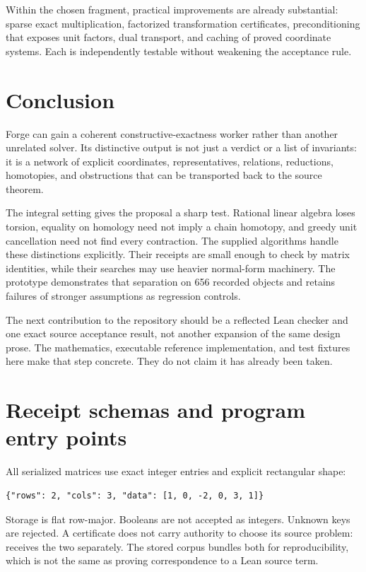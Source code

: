 \documentclass[11pt,letterpaper]{article}
\theoremstyle{definition}\newtheorem{definition}[theorem]{Definition}
\theoremstyle{remark}\newtheorem{remark}[theorem]{Remark}
\newcommand{\code}[1]{\texttt{\detokenize{#1}}}
\begin{document}
Within the chosen fragment, practical improvements are already substantial:
sparse exact multiplication, factorized transformation certificates,
preconditioning that exposes unit factors, dual transport, and caching of
proved coordinate systems. Each is independently testable without weakening
the acceptance rule.

\section{Conclusion}
Forge can gain a coherent constructive-exactness worker rather than another
unrelated solver. Its distinctive output is not just a verdict or a list of
invariants: it is a network of explicit coordinates, representatives,
relations, reductions, homotopies, and obstructions that can be transported
back to the source theorem.

The integral setting gives the proposal a sharp test. Rational linear algebra
loses torsion, equality on homology need not imply a chain homotopy, and greedy
unit cancellation need not find every contraction. The supplied algorithms
handle these distinctions explicitly. Their receipts are small enough to check
by matrix identities, while their searches may use heavier normal-form
machinery. The prototype demonstrates that separation on 656 recorded objects
and retains failures of stronger assumptions as regression controls.

The next contribution to the repository should be a reflected Lean checker and
one exact source acceptance result, not another expansion of the same design
prose. The mathematics, executable reference implementation, and test fixtures
here make that step concrete. They do not claim it has already been taken.

\appendix
\section{Receipt schemas and program entry points}
\label{sec:schemas}

All serialized matrices use exact integer entries and explicit rectangular
shape:
\begin{lstlisting}
{"rows": 2, "cols": 3, "data": [1, 0, -2, 0, 3, 1]}
\end{lstlisting}
Storage is flat row-major. Booleans are not accepted as integers. Unknown keys
are rejected. A certificate does not carry authority to choose its source
problem: \code{check(problem, certificate)} receives the two separately.
The stored corpus bundles both for reproducibility, which is not the same as
proving correspondence to a Lean source term.
\end{document}
